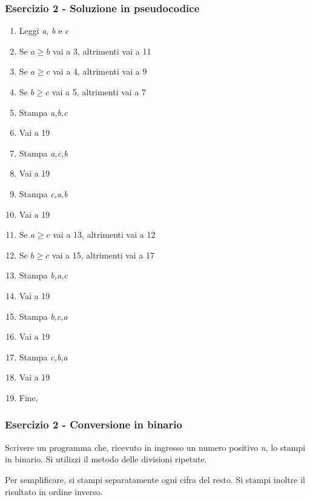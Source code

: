 \documentclass[handout]{beamer}
\begin{document}
\begin{frame}
\frametitle{Esercizio 2 - Soluzione in pseudocodice}
\begin{multicols}{2}
\begin{enumerate}
	\item Leggi \emph{a}, \emph{b} e \emph{c}
	\item Se $a \geq b$ vai a 3, altrimenti vai a 11
	
	\item Se $a \geq c$ vai a 4, altrimenti vai a 9
	\item Se $b \geq c$ vai a 5, altrimenti vai a 7
	\item Stampa \emph{a,b,c}
	\item Vai a 19
	\item Stampa \emph{a,c,b}
	\item Vai a 19
	\item Stampa \emph{c,a,b}
	\item Vai a 19
	
	\item Se $a \geq c$ vai a 13, altrimenti vai a 12
	\item Se $b \geq c$ vai a 15, altrimenti vai a 17
	\item Stampa \emph{b,a,c}
	\item Vai a 19
	\item Stampa \emph{b,c,a}
	\item Vai a 19
	\item Stampa \emph{c,b,a}
	\item Vai a 19
	
	\item Fine.
\end{enumerate}
\end{multicols}
\end{frame}

\fi

\begin{frame}
\frametitle{Esercizio 2 - Conversione in binario}
Scrivere un programma che, ricevuto in ingresso un numero positivo \emph{n}, lo stampi in binario. Si utilizzi il metodo delle divisioni ripetute.

Per semplificare, si stampi separatamente ogni cifra del resto. Si stampi inoltre il risultato in ordine inverso.
\end{frame}
\end{document}
